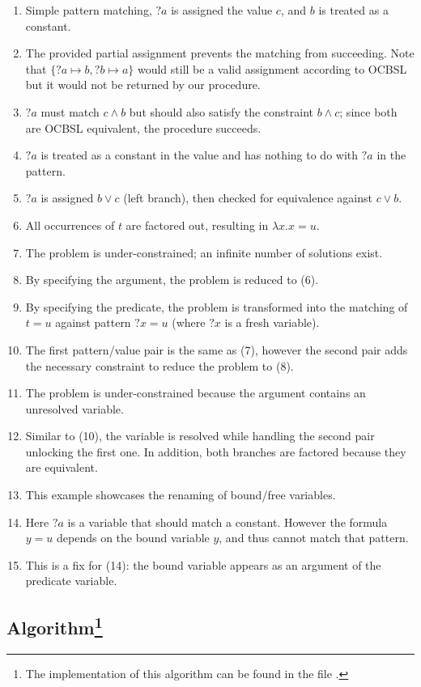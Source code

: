 \begin{enumerate}
\itemsep-0.1cm
\item Simple pattern matching, ${?a}$ is assigned the value $c$, and $b$ is treated as a constant.
\item The provided partial assignment prevents the matching from succeeding. Note that $\{ ?a \mapsto b, ?b \mapsto a \}$ would still be a valid assignment according to OCBSL but it would not be returned by our procedure.
\item ${?a}$ must match $c \land b$ but should also satisfy the constraint $b \land c$; since both are OCBSL equivalent, the procedure succeeds.
\item ${?a}$ is treated as a constant in the value and has nothing to do with ${?a}$ in the pattern.
\item ${?a}$ is assigned $b \lor c$ (left branch), then checked for equivalence against $c \lor b$.
\item All occurrences of $t$ are factored out, resulting in $\lambda x. x = u$.
\item The problem is under-constrained; an infinite number of solutions exist.
\item By specifying the argument, the problem is reduced to (6).
\item By specifying the predicate, the problem is transformed into the matching of $t = u$ against pattern ${?x} = u$ (where ${?x}$ is a fresh variable).
\item The first pattern/value pair is the same as (7), however the second pair adds the necessary constraint to reduce the problem to (8).
\item The problem is under-constrained because the argument contains an unresolved variable.
\item Similar to (10), the variable is resolved while handling the second pair unlocking the first one. In addition, both branches are factored because they are equivalent.
\item This example showcases the renaming of bound/free variables.
\item Here ${?a}$ is a variable that should match a constant. However the formula $y = u$ depends on the bound variable $y$, and thus cannot match that pattern.
\item This is a fix for (14): the bound variable appears as an argument of the predicate variable.
\end{enumerate}

\subsection{Algorithm\texorpdfstring{\footnote{The implementation of this algorithm can be found in the file \href{https://github.com/FlorianCassayre/master-project/blob/master/src/main/scala/me/cassayre/florian/masterproject/front/proof/unification/UnificationUtils.scala}{}.}}{Lg}}

